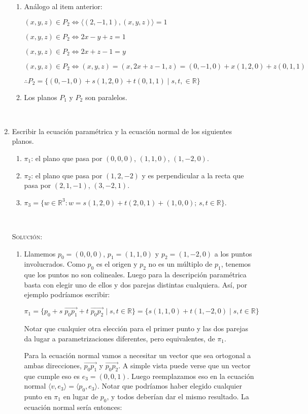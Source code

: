 \documentclass[a4paper,12pt,twoside,spanish,reqno]{amsbook}
\numberwithin{equation}{section}
\newcommand{\rta}{\noindent\textsc{Solución: }}
\begin{document}
\begin{enumerate}[resume]
\begin{enumerate}
	\item Análogo al item anterior:

$ (x,y,z) \in P_2 \iff \langle (2,-1,1) , (x,y,z) \rangle = 1$
	
$ (x,y,z) \in P_2 \iff 2x-y+z = 1$	

$ (x,y,z) \in P_2 \iff 2x+z-1 = y$	

$ (x,y,z) \in P_2 \iff (x,y,z) = (x,2x+z-1,z) = (0,-1,0) + x (1,2,0) + z (0,1,1)$	

$ \therefore \boxed{ P_2 = \{ (0,-1,0) + s (1,2,0) + t (0,1,1) \; | \; s,t, \in \mathbb{R} \} }$

	\item Los planos $P_1$ y $P_2$ son paralelos.
\end{enumerate}

\

\item\label{ej-planos} Escribir la ecuaci{\'o}n param\'etrica  y la ecuaci{\'o}n normal de los siguientes planos.
\begin{enumerate}
	\item $\pi_1$: el plano que pasa por $(0,0,0)$, $(1,1,0)$, $(1,-2,0)$.
	\item $\pi_2$: el plano que pasa por $(1,2,-2)$ y es perpendicular a la
	recta que pasa por $(2,1,-1)$, $(3,-2,1)$.
	\item\label{ej-planos-c}  $\pi_3=\{w\in\mathbb{R}^3: w=s(1,2,0)+t(2,0,1)+(1,0,0);\,s,t\in \mathbb R\}$.
\end{enumerate}

\

\rta

\begin{enumerate}
	\item Llamemos $p_0=(0,0,0)$, $p_1=(1,1,0)$ y $p_2=(1,-2,0)$ a los puntos involucrados. Como $p_0$ es el origen y $p_2$ no es un múltiplo de $p_1$, tenemos que los puntos no son colineales. Luego para la descripción paramétrica basta con elegir uno de ellos y dos parejas distintas cualquiera. Así, por ejemplo podríamos escribir:
	
$\pi_1 = \{ p_0 + s \; \overrightarrow{p_0 p_1} + t \; \overrightarrow{p_0 p_2} \; | \; s,t \in \mathbb{R} \}  = \boxed{ \{ s (1,1,0) + t (1,-2,0) \; | \; s,t \in \mathbb{R} \} }$

Notar que cualquier otra elección para el primer punto y las dos parejas da lugar a parametrizaciones diferentes, pero equivalentes, de $\pi_1$.

Para la ecuación normal vamos a necesitar un vector que sea ortogonal a ambas direcciones, $\overrightarrow{p_0 p_1}$ y $\overrightarrow{p_0 p_2}$. A simple vista puede verse que un vector que cumple eso es $e_3 = (0,0,1)$. Luego reemplazamos eso en la ecuación normal $\langle v,e_3 \rangle = \langle p_0, e_3 \rangle$. Notar que podríamos haber elegido cualquier punto en $\pi_1$ en lugar de $p_0$, y todos deberían dar el mismo resultado. La ecuación normal sería entonces:


\end{enumerate}
\end{enumerate}
\end{document}
